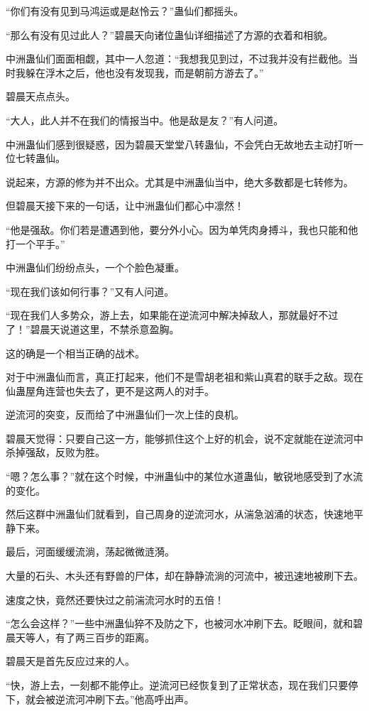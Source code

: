 \begin{this_body}
“你们有没有见到马鸿运或是赵怜云？”蛊仙们都摇头。

“那么有没有见过此人？”碧晨天向诸位蛊仙详细描述了方源的衣着和相貌。

中洲蛊仙们面面相觑，其中一人忽道：“我想我见到过，不过我并没有拦截他。当时我躲在浮木之后，他也没有发现我，而是朝前方游去了。”

碧晨天点点头。

“大人，此人并不在我们的情报当中。他是敌是友？”有人问道。

中洲蛊仙们感到很疑惑，因为碧晨天堂堂八转蛊仙，不会凭白无故地去主动打听一位七转蛊仙。

说起来，方源的修为并不出众。尤其是中洲蛊仙当中，绝大多数都是七转修为。

但碧晨天接下来的一句话，让中洲蛊仙们都心中凛然！

“他是强敌。你们若是遭遇到他，要分外小心。因为单凭肉身搏斗，我也只能和他打一个平手。”

中洲蛊仙们纷纷点头，一个个脸色凝重。

“现在我们该如何行事？”又有人问道。

“现在我们人多势众，游上去，如果能在逆流河中解决掉敌人，那就最好不过了！”碧晨天说道这里，不禁杀意盈胸。

这的确是一个相当正确的战术。

对于中洲蛊仙而言，真正打起来，他们不是雪胡老祖和紫山真君的联手之敌。现在仙蛊屋角连营也失去了，更不是这两人的对手。

逆流河的突变，反而给了中洲蛊仙们一次上佳的良机。

碧晨天觉得：只要自己这一方，能够抓住这个上好的机会，说不定就能在逆流河中杀掉强敌，反败为胜。

“嗯？怎么事？”就在这个时候，中洲蛊仙中的某位水道蛊仙，敏锐地感受到了水流的变化。

然后这群中洲蛊仙们就看到，自己周身的逆流河水，从湍急汹涌的状态，快速地平静下来。

最后，河面缓缓流淌，荡起微微涟漪。

大量的石头、木头还有野兽的尸体，却在静静流淌的河流中，被迅速地被刷下去。

速度之快，竟然还要快过之前湍流河水时的五倍！

“怎么会这样？”一些中洲蛊仙猝不及防之下，也被河水冲刷下去。眨眼间，就和碧晨天等人，有了两三百步的距离。

碧晨天是首先反应过来的人。

“快，游上去，一刻都不能停止。逆流河已经恢复到了正常状态，现在我们只要停下，就会被逆流河冲刷下去。”他高呼出声。


\end{this_body}
